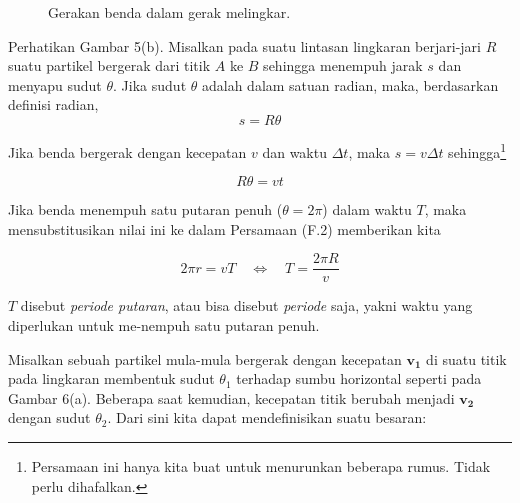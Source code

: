 \documentclass[12pt, a4paper]{article}\usepackage[utf8]{inputenc}
\theoremstyle{plain}
\theoremstyle{plain}
\numberwithin{equation}{section}
\theoremstyle{definition}
\begin{document}
\begin{figure}[htb]
{
		}		
		\caption{Gerakan benda dalam gerak melingkar.}
	\end{figure}
	
	Perhatikan Gambar 5(b). Misalkan pada suatu lintasan lingkaran berjari-jari $R$ suatu partikel bergerak dari titik $A$ ke $B$ sehingga menempuh jarak $s$ dan menyapu sudut $\theta$. Jika sudut $\theta$ adalah dalam satuan radian, maka, berdasarkan definisi radian,
	\begin{equation}
		s = R \theta
	\end{equation}
	
	Jika benda bergerak dengan kecepatan $v$ dan waktu $\Delta t$, maka $s = v \Delta t$ sehingga\footnote{Persamaan ini hanya kita buat untuk menurunkan beberapa rumus. Tidak perlu dihafalkan.}
	
	\begin{equation}
		R \theta = vt
	\end{equation}
	
	Jika benda menempuh satu putaran penuh ($\theta = 2\pi$) dalam waktu $T$, maka mensubstitusikan nilai ini ke dalam Persamaan (F.2) memberikan kita
	
	\begin{equation}
		2\pi r = vT \quad \Longleftrightarrow \quad T = \frac{2\pi R}{v}
	\end{equation}
	
	$T$ disebut \textit{periode putaran}, atau bisa disebut \textit{periode} saja, yakni waktu yang diperlukan untuk me-\linebreak nempuh satu putaran penuh.
	
	\par
	Misalkan sebuah partikel mula-mula bergerak dengan kecepatan $\boldsymbol{v_{1}}$ di suatu titik pada lingkaran membentuk sudut $\theta_{1}$ terhadap sumbu horizontal seperti pada Gambar 6(a). Beberapa saat kemudian, kecepatan titik berubah menjadi $\boldsymbol{v_2}$ dengan sudut $\theta_{2}$. Dari sini kita dapat mendefinisikan suatu besaran:
\end{document}
